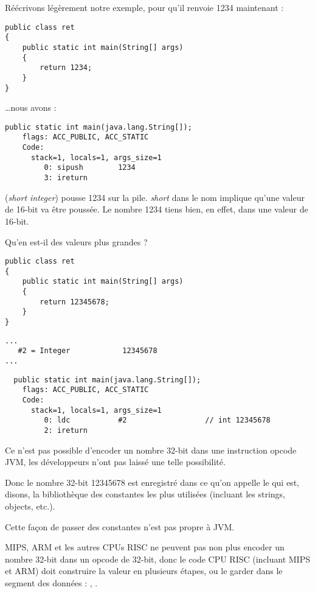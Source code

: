 Réécrivons légèrement notre exemple, pour qu'il renvoie 1234 maintenant :

\begin{lstlisting}[style=customjava]
public class ret
{
	public static int main(String[] args)
	{
		return 1234;
	}
}
\end{lstlisting}

\dots nous avons :

\begin{lstlisting}[caption=JDK 1.7 (extrait)]
  public static int main(java.lang.String[]);
    flags: ACC_PUBLIC, ACC_STATIC
    Code:
      stack=1, locals=1, args_size=1
         0: sipush        1234
         3: ireturn
\end{lstlisting}

 (\emph{short integer}) pousse 1234 sur la pile.
\emph{short} dans le nom implique qu'une valeur de 16-bit va être poussée.
Le nombre 1234 tiens bien, en effet, dans une valeur de 16-bit.

Qu'en est-il des valeurs plus grandes ?

\begin{lstlisting}[style=customjava]
public class ret
{
	public static int main(String[] args)
	{
		return 12345678;
	}
}
\end{lstlisting}

\begin{lstlisting}[caption=Constant pool]
...
   #2 = Integer            12345678
...
\end{lstlisting}

\begin{lstlisting}
  public static int main(java.lang.String[]);
    flags: ACC_PUBLIC, ACC_STATIC
    Code:
      stack=1, locals=1, args_size=1
         0: ldc           #2                  // int 12345678
         2: ireturn
\end{lstlisting}

Ce n'est pas possible d'encoder un nombre 32-bit dans une instruction opcode JVM,
les développeurs n'ont pas laissé une telle possibilité.

Donc le nombre 32-bit 12345678 est enregistré dans ce qu'on appelle le  qui est, disons,
la bibliothèque des constantes les plus utilisées (incluant les strings, objects, etc.).

Cette façon de passer des constantes n'est pas propre à JVM.

MIPS, ARM et les autres CPUs RISC ne peuvent pas non plus encoder un nombre 32-bit
dans un opcode de 32-bit, donc le code CPU RISC (incluant MIPS et ARM) doit construire la valeur
en plusieurs étapes, ou le garder dans le segment des données :
, .

